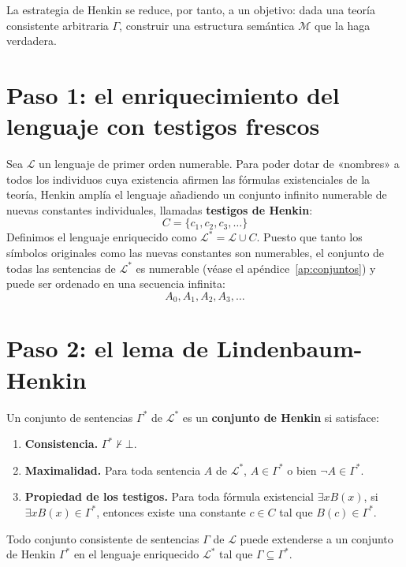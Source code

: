 La estrategia de Henkin se reduce, por tanto, a un objetivo: dada una teoría consistente arbitraria $\Gamma$, construir una estructura semántica $\mathcal{M}$ que la haga verdadera.

\section{Paso 1: el enriquecimiento del lenguaje con testigos frescos}

Sea $\mathcal{L}$ un lenguaje de primer orden numerable. Para poder dotar de «nombres» a todos los individuos cuya existencia afirmen las fórmulas existenciales de la teoría, Henkin amplía el lenguaje añadiendo un conjunto infinito numerable de nuevas constantes individuales, llamadas \textbf{testigos de Henkin}:
\[
C = \{c_1, c_2, c_3, \dots\}
\]
Definimos el lenguaje enriquecido como $\mathcal{L}^* = \mathcal{L} \cup C$. Puesto que tanto los símbolos originales como las nuevas constantes son numerables, el conjunto de todas las sentencias de $\mathcal{L}^*$ es numerable (véase el apéndice~\ref{ap:conjuntos}) y puede ser ordenado en una secuencia infinita:
\[
A_0, A_1, A_2, A_3, \dots
\]

\section{Paso 2: el lema de Lindenbaum-Henkin}

\begin{definition}
Un conjunto de sentencias $\Gamma^*$ de $\mathcal{L}^*$ es un \textbf{conjunto de Henkin} si satisface:
\begin{enumerate}
    \item \textbf{Consistencia.} $\Gamma^* \nvdash \bot$.
    \item \textbf{Maximalidad.} Para toda sentencia $A$ de $\mathcal{L}^*$, $A \in \Gamma^*$ o bien $\neg A \in \Gamma^*$.
    \item \textbf{Propiedad de los testigos.} Para toda fórmula existencial $\exists x B(x)$, si $\exists x B(x) \in \Gamma^*$, entonces existe una constante $c \in C$ tal que $B(c) \in \Gamma^*$.
\end{enumerate}
\end{definition}

\begin{lemma}\label{lema_lindenbaum_henkin}
Todo conjunto consistente de sentencias $\Gamma$ de $\mathcal{L}$ puede extenderse a un conjunto de Henkin $\Gamma^*$ en el lenguaje enriquecido $\mathcal{L}^*$ tal que $\Gamma \subseteq \Gamma^*$.
\end{lemma}

